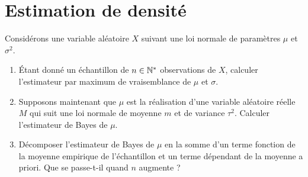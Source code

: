 \documentclass[french,11pt]{article}
\begin{document}
\section{Estimation de densité}
Considérons une variable aléatoire $X$ suivant une loi normale de paramètres
$\mu$ et $\sigma^2$.
\begin{enumerate}
\item Étant donné un échantillon de $n \in \mathbb{N}^*$ observations de $X$, calculer
  l'estimateur par maximum de vraisemblance de $\mu$ et $\sigma$.
\item Supposons maintenant que $\mu$ est la réalisation d'une variable
  aléatoire réelle $M$ qui suit une loi normale de moyenne $m$ et de variance
  $\tau^2$. Calculer l'estimateur de Bayes de $\mu$.
\item Décomposer l'estimateur de Bayes de $\mu$ en la somme d'un terme fonction
  de la moyenne empirique de l'échantillon et un terme dépendant de la moyenne
  a priori. Que se passe-t-il quand $n$ augmente ?
\end{enumerate}



\end{document}
